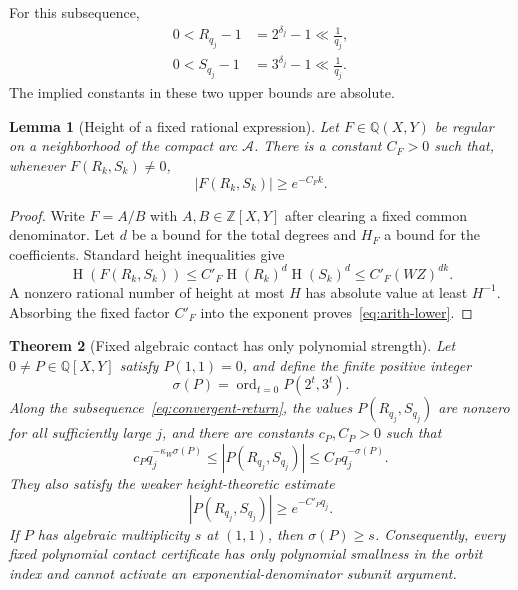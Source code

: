 \documentclass[11pt]{article}
\newtheorem{theorem}{Theorem}[section]
\newtheorem{lemma}[theorem]{Lemma}
\theoremstyle{definition}
\theoremstyle{remark}
\newcommand{\Q}{\mathbb Q}
\newcommand{\Z}{\mathbb Z}
\newcommand{\ord}{\operatorname{ord}}
\newcommand{\Hgt}{\operatorname{H}}
\begin{document}
For this subsequence,
\begin{align}
 0<R_{q_j}-1&=2^{\delta_j}-1\ll\frac1{q_j},
 \label{eq:Rreturn}\\
 0<S_{q_j}-1&=3^{\delta_j}-1\ll\frac1{q_j}.
 \label{eq:Sreturn}
\end{align}
The implied constants in these two upper bounds are absolute.

\begin{lemma}[Height of a fixed rational expression]
\label{lem:rational-height}
Let $F\in\Q(X,Y)$ be regular on a neighborhood of the compact arc $\mathcal A$.  There is a
constant $C_F>0$ such that, whenever $F(R_k,S_k)\ne0$,
\begin{equation}
 |F(R_k,S_k)|\ge e^{-C_F k}.
 \label{eq:arith-lower}
\end{equation}
\end{lemma}

\begin{proof}
Write $F=A/B$ with $A,B\in\Z[X,Y]$ after clearing a fixed common denominator.  Let $d$ be a
bound for the total degrees and $H_F$ a bound for the coefficients.  Standard height
inequalities give
\[
 \Hgt(F(R_k,S_k))\le C'_F\Hgt(R_k)^d\Hgt(S_k)^d
 \le C'_F(WZ)^{dk}.
\]
A nonzero rational number of height at most $H$ has absolute value at least $H^{-1}$.
Absorbing the fixed factor $C'_F$ into the exponent proves~\eqref{eq:arith-lower}.
\end{proof}

\begin{theorem}[Fixed algebraic contact has only polynomial strength]
\label{thm:fixed-contact}
Let $0\ne P\in\Q[X,Y]$ satisfy $P(1,1)=0$, and define the finite positive integer
\[
 \sigma(P)=\ord_{t=0}P(2^t,3^t).
\]
Along the subsequence~\eqref{eq:convergent-return}, the values
$P(R_{q_j},S_{q_j})$ are nonzero for all sufficiently large $j$, and there are constants
$c_P,C_P>0$ such that
\begin{equation}
 c_Pq_j^{-\kappa_W\sigma(P)}
 \le |P(R_{q_j},S_{q_j})|
 \le C_Pq_j^{-\sigma(P)}.
 \label{eq:two-sided-contact}
\end{equation}
They also satisfy the weaker height-theoretic estimate
\begin{equation}
 |P(R_{q_j},S_{q_j})|\ge e^{-C'_Pq_j}.
 \label{eq:exp-lower}
\end{equation}
If $P$ has algebraic multiplicity $s$ at $(1,1)$, then $\sigma(P)\ge s$.
Consequently, every fixed polynomial contact certificate has only polynomial smallness in
the orbit index and cannot activate an exponential-denominator subunit argument.
\end{theorem}
\end{document}
